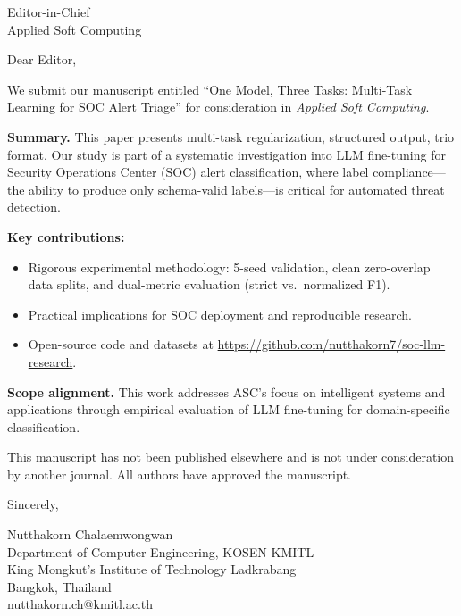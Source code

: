 \documentclass[11pt]{letter}
\begin{document}
\begin{letter}{Editor-in-Chief \\ Applied Soft Computing}

\opening{Dear Editor,}

We submit our manuscript entitled ``One Model, Three Tasks: Multi-Task Learning for SOC Alert Triage'' for consideration in \textit{Applied Soft Computing}.

\textbf{Summary.} This paper presents multi-task regularization, structured output, trio format. Our study is part of a systematic investigation into LLM fine-tuning for Security Operations Center (SOC) alert classification, where label compliance---the ability to produce only schema-valid labels---is critical for automated threat detection.

\textbf{Key contributions:}
\begin{itemize}
\item Rigorous experimental methodology: 5-seed validation, clean zero-overlap data splits, and dual-metric evaluation (strict vs.\ normalized F1).
\item Practical implications for SOC deployment and reproducible research.
\item Open-source code and datasets at \url{https://github.com/nutthakorn7/soc-llm-research}.
\end{itemize}

\textbf{Scope alignment.} This work addresses ASC's focus on intelligent systems and applications through empirical evaluation of LLM fine-tuning for domain-specific classification.

This manuscript has not been published elsewhere and is not under consideration by another journal. All authors have approved the manuscript.

\closing{Sincerely,}

Nutthakorn Chalaemwongwan \\
Department of Computer Engineering, KOSEN-KMITL \\
King Mongkut's Institute of Technology Ladkrabang \\
Bangkok, Thailand \\
nutthakorn.ch@kmitl.ac.th

\end{letter}
\end{document}
